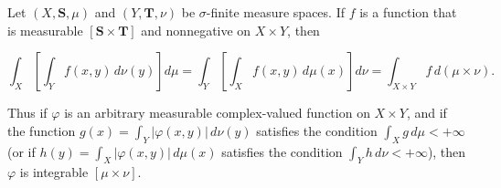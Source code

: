 Let $(X, \mathbf{S}, \mu)$ and $(Y, \mathbf{T}, \nu)$ be $\sigma$-finite measure spaces. If $f$ is a function that is measurable $[\mathbf{S} \times \mathbf{T}]$ and nonnegative on $X \times Y$, then

$$\int_X \left[ \int_Y f(x, y) \, d\nu(y) \right] d\mu = \int_Y \left[ \int_X f(x, y) \, d\mu(x) \right] d\nu = \int_{X \times Y} f \, d(\mu \times \nu).$$

Thus if $\varphi$ is an arbitrary measurable complex-valued function on $X \times Y$, and if the function $g(x) = \int_Y |\varphi(x, y)| \, d\nu(y)$ satisfies the condition $\int_X g \, d\mu < +\infty$ (or if $h(y) = \int_X |\varphi(x, y)| \, d\mu(x)$ satisfies the condition $\int_Y h \, d\nu < +\infty$), then $\varphi$ is integrable $[\mu \times \nu]$.
